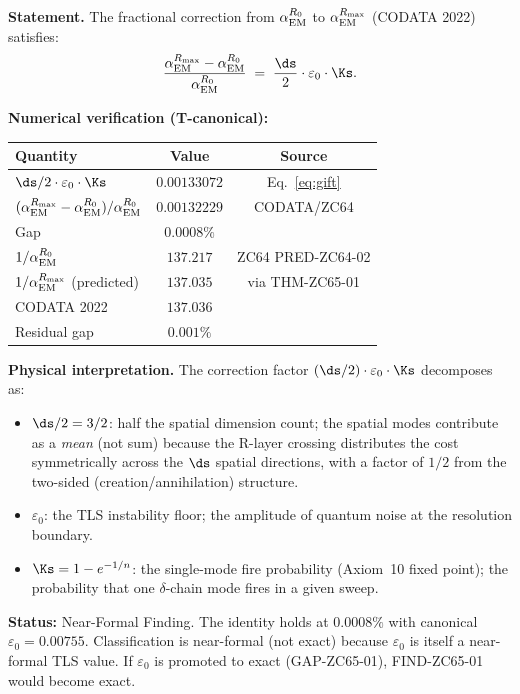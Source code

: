 \documentclass[12pt, a4paper]{article}
\renewcommand{\aEM}{\alpha_{\rm EM}}
\begin{document}

\begin{giftbox}[title={FIND-ZC65-01: $\delta\alpha/\alpha = (\ds/2)\cdot\varepsilon_0\cdot\Ks$
  (Precision 0.0008\%)}]
\textbf{Statement.}
The fractional correction from $\aEM^{R_0}$ to $\aEM^{R_{\max}}$
(CODATA 2022) satisfies:
\begin{equation}
  \frac{\aEM^{R_{\max}} - \aEM^{R_0}}{\aEM^{R_0}}
  \;=\;
  \frac{\ds}{2}\cdot\varepsilon_0\cdot\Ks.
  \label{eq:gift}
\end{equation}

\textbf{Numerical verification (T-canonical):}
\begin{center}
\begin{tabular}{@{}lcc@{}}
\toprule
Quantity & Value & Source \\
\midrule
$\ds/2 \cdot \varepsilon_0 \cdot \Ks$ & $0.00133072$ & Eq.~\eqref{eq:gift} \\
$(\aEM^{R_{\max}} - \aEM^{R_0})/\aEM^{R_0}$ & $0.00132229$ & CODATA/ZC64 \\
Gap & $0.0008\%$ & \\
\midrule
$1/\aEM^{R_0}$ & $137.217$ & ZC64 PRED-ZC64-02 \\
$1/\aEM^{R_{\max}}$ (predicted) & $137.035$ & via THM-ZC65-01 \\
CODATA 2022 & $137.036$ & \\
Residual gap & $0.001\%$ & \\
\bottomrule
\end{tabular}
\end{center}

\textbf{Physical interpretation.}
The correction factor $(\ds/2)\cdot\varepsilon_0\cdot\Ks$ decomposes as:
\begin{itemize}[leftmargin=2em, noitemsep]
  \item $\ds/2 = 3/2$: half the spatial dimension count;
    the spatial modes contribute as a \emph{mean} (not sum)
    because the R-layer crossing distributes the cost symmetrically
    across the $\ds$ spatial directions, with a factor of $1/2$
    from the two-sided (creation/annihilation) structure.
  \item $\varepsilon_0$: the TLS instability floor; the
    amplitude of quantum noise at the resolution boundary.
  \item $\Ks = 1-e^{-1/n}$: the single-mode fire probability
    (Axiom~10 fixed point); the probability that one
    $\delta$-chain mode fires in a given sweep.
\end{itemize}

\textbf{Status:} Near-Formal Finding.
The identity holds at $0.0008\%$ with canonical $\varepsilon_0 = 0.00755$.
Classification is near-formal (not exact) because $\varepsilon_0$
is itself a near-formal TLS value.
If $\varepsilon_0$ is promoted to exact (GAP-ZC65-01), FIND-ZC65-01
would become exact.
\end{giftbox}
\end{document}
